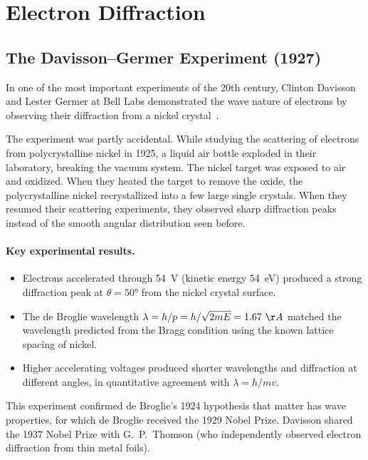 \section{Electron Diffraction}

\subsection{The Davisson--Germer Experiment (1927)}

In one of the most important experiments of the 20th century, Clinton Davisson and Lester Germer at Bell Labs demonstrated the wave nature of electrons by observing their diffraction from a nickel crystal~\cite{davisson1927scattering}.

The experiment was partly accidental. While studying the scattering of electrons from polycrystalline nickel in 1925, a liquid air bottle exploded in their laboratory, breaking the vacuum system. The nickel target was exposed to air and oxidized. When they heated the target to remove the oxide, the polycrystalline nickel recrystallized into a few large single crystals. When they resumed their scattering experiments, they observed sharp diffraction peaks instead of the smooth angular distribution seen before.

\paragraph{Key experimental results.}
\begin{itemize}[nosep]
  \item Electrons accelerated through \SI{54}{\volt} (kinetic energy \SI{54}{\electronvolt}) produced a strong diffraction peak at $\theta = 50°$ from the nickel crystal surface.
  \item The de Broglie wavelength $\lambda = h/p = h/\sqrt{2mE} = 1.67~\AA{}$ matched the wavelength predicted from the Bragg condition using the known lattice spacing of nickel.
  \item Higher accelerating voltages produced shorter wavelengths and diffraction at different angles, in quantitative agreement with $\lambda = h/mv$.
\end{itemize}

This experiment confirmed de Broglie's 1924 hypothesis that matter has wave properties, for which de Broglie received the 1929 Nobel Prize. Davisson shared the 1937 Nobel Prize with G.~P.~Thomson (who independently observed electron diffraction from thin metal foils).

